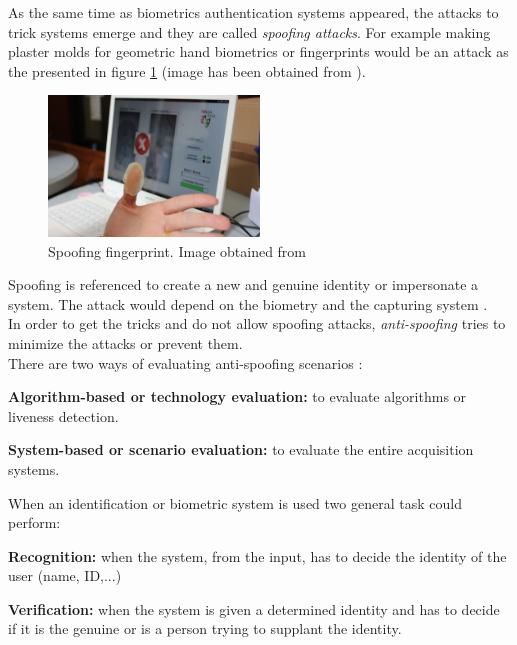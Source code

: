 As the same time as biometrics authentication systems appeared, the attacks to trick systems emerge and they are called \textit{spoofing attacks}. For example making plaster molds for geometric hand biometrics or fingerprints would be an attack as the presented in figure \ref{fig:Spoof_fingerprint} (image has been obtained from \cite{fingerprint_image}).\\


\begin{figure}[htb]
\centering
\includegraphics[width=0.5\textwidth]{images_miscelaneus/spoofing_fingerprint.jpg}
\caption{Spoofing fingerprint. Image obtained from \cite{fingerprint_image}} \label{fig:Spoof_fingerprint}
\end{figure}

Spoofing is referenced to create a new and genuine identity or impersonate a system. The attack would depend on the biometry and the capturing system \cite{Spoofing_survey}.\\

In order to get the tricks and do not allow spoofing attacks, \textit{anti-spoofing} tries to minimize the attacks or prevent them.\\

There are two ways of evaluating anti-spoofing scenarios \cite{Spoofing_survey}:
\begin{description}[noitemsep,topsep=8pt,parsep=0pt,partopsep=20pt]
\item \textbf{Algorithm-based or technology evaluation:} to evaluate algorithms or liveness detection.
\item \textbf{System-based or scenario evaluation:} to evaluate the entire acquisition systems.
\end{description}

When an identification or biometric system is used two general task could perform:
\begin{description}[noitemsep,topsep=8pt,parsep=0pt,partopsep=20pt]
\item \textbf{Recognition:} when the system, from the input, has to decide the identity of the user (name, ID,...)
\item \textbf{Verification:} when the system is given a determined identity and has to decide if it is the genuine or is a person trying to supplant the identity.
\end{description}

